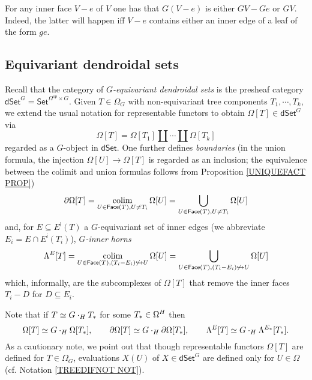 \documentclass[a4paper,10pt,draft]{article}%
\begin{document}
\begin{remark}\label{GINNER REM}
	For any inner face $V-e$ of $V$ one has 
	that $G(V-e)$ is either $GV - Ge$ or $GV$.
	Indeed, the latter will happen iff $V-e$ contains either an inner edge of a leaf of the form $ge$.
\end{remark}



\subsection{Equivariant dendroidal sets}


Recall \cite[\S 5.4]{Per17} that the category of 
\textit{$G$-equivariant dendroidal sets}
is the presheaf category 
$\mathsf{dSet}^G = \mathsf{Set}^{\Omega^{op} \times G}$.
Given $T \in \Omega_G$ with non-equivariant tree components $T_1,\cdots,T_k$,
we extend the usual notation for representable functors 
to obtain $\Omega[T] \in \mathsf{dSet}^G$ via
\[
	\Omega[T] = \Omega[T_1] \amalg \cdots \amalg \Omega[T_k]
\]
regarded as a $G$-object in $\mathsf{dSet}$.
One further defines \textit{boundaries} (in the union formula, 
the injection $\Omega[U] \to \Omega[T]$ is regarded as 
an inclusion; the equivalence between the colimit and union formulas follows from Proposition \ref{UNIQUEFACT PROP})
\[
	\partial \Omega[T] = 
	\mathop{\operatorname{colim}}_{U \in \mathsf{Face}(T),U \neq T_i}
	\Omega[U] =
	\bigcup_{U \in \mathsf{Face}(T),U \neq T_i}
	\Omega[U]
\]
and, for $E \subseteq E^{\mathsf{i}}(T)$ a $G$-equivariant set of inner edges 
(we abbreviate $E_i = E \cap E^{\mathsf{i}}(T_i)$), \textit{$G$-inner horns}
\[
	\Lambda^{E}[T] = 
	\mathop{\operatorname{colim}}_{U \in 
	\mathsf{Face}(T),
	(T_i - E_i) \not \hookrightarrow U}
	\Omega[U] =
	\bigcup_{U \in 
	\mathsf{Face}(T),
	(T_i - E_i) \not \hookrightarrow U}
	\Omega[U]
\]
which, informally, are the subcomplexes of $\Omega[T]$ that remove the inner faces $T_i-D$ for $D \subseteq E_i$.

Note that if $T \simeq G \cdot_H T_{\**}$ for some $T_{\**} \in \Omega^H$ then 
\[
	\Omega[T] \simeq G \cdot_H \Omega[T_{\**}], \qquad
	\partial \Omega[T] \simeq G \cdot_H \partial \Omega[T_{\**}], \qquad
	\Lambda^{E}[T] \simeq G \cdot_H \Lambda^{E_{\**}}[T_{\**}].
\]
As a cautionary note, we point out that though representable functors $\Omega[T]$ are defined for $T \in \Omega_G$,
evaluations $X(U)$ of $X \in \mathsf{dSet}^G$
are defined only for $U \in \Omega$ (cf. Notation \ref{TREEDIFNOT NOT}).
\end{document}
